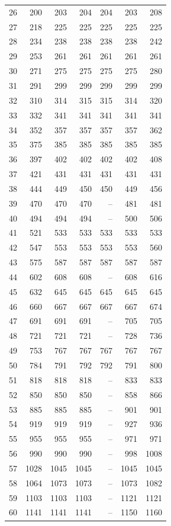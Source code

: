 \begin{longtable}{rrrrrrr}
26 & 200 & 203 & 204 & 204 & 203 & 208 \\
27 & 218 & 225 & 225 & 225 & 225 & 225 \\
28 & 234 & 238 & 238 & 238 & 238 & 242 \\
29 & 253 & 261 & 261 & 261 & 261 & 261 \\
30 & 271 & 275 & 275 & 275 & 275 & 280 \\
31 & 291 & 299 & 299 & 299 & 299 & 299 \\
32 & 310 & 314 & 315 & 315 & 314 & 320 \\
33 & 332 & 341 & 341 & 341 & 341 & 341 \\
34 & 352 & 357 & 357 & 357 & 357 & 362 \\
35 & 375 & 385 & 385 & 385 & 385 & 385 \\
36 & 397 & 402 & 402 & 402 & 402 & 408 \\
37 & 421 & 431 & 431 & 431 & 431 & 431 \\
38 & 444 & 449 & 450 & 450 & 449 & 456 \\
39 & 470 & 470 & 470 & -- & 481 & 481 \\
40 & 494 & 494 & 494 & -- & 500 & 506 \\
41 & 521 & 533 & 533 & 533 & 533 & 533 \\
42 & 547 & 553 & 553 & 553 & 553 & 560 \\
43 & 575 & 587 & 587 & 587 & 587 & 587 \\
44 & 602 & 608 & 608 & -- & 608 & 616 \\
45 & 632 & 645 & 645 & 645 & 645 & 645 \\
46 & 660 & 667 & 667 & 667 & 667 & 674 \\
47 & 691 & 691 & 691 & -- & 705 & 705 \\
48 & 721 & 721 & 721 & -- & 728 & 736 \\
49 & 753 & 767 & 767 & 767 & 767 & 767 \\
50 & 784 & 791 & 792 & 792 & 791 & 800 \\
51 & 818 & 818 & 818 & -- & 833 & 833 \\
52 & 850 & 850 & 850 & -- & 858 & 866 \\
53 & 885 & 885 & 885 & -- & 901 & 901 \\
54 & 919 & 919 & 919 & -- & 927 & 936 \\
55 & 955 & 955 & 955 & -- & 971 & 971 \\
56 & 990 & 990 & 990 & -- & 998 & 1008 \\
57 & 1028 & 1045 & 1045 & -- & 1045 & 1045 \\
58 & 1064 & 1073 & 1073 & -- & 1073 & 1082 \\
59 & 1103 & 1103 & 1103 & -- & 1121 & 1121 \\
60 & 1141 & 1141 & 1141 & -- & 1150 & 1160 \\
\end{longtable}
\endgroup
